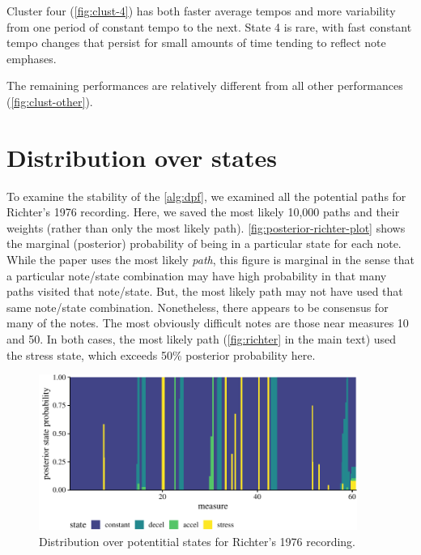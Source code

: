 \documentclass[aoas]{imsart}
\begin{document}
Cluster four (\autoref{fig:clust-4}) has both faster average tempos and
more variability from one period of constant tempo to the next. State 4
is rare, with fast constant tempo changes that persist for small amounts
of time tending to reflect note emphases.

The remaining performances are relatively different from all other
performances (\autoref{fig:clust-other}).

\hypertarget{distribution-over-states}{%
\section{Distribution over states}\label{distribution-over-states}}

To examine the stability of the \autoref{alg:dpf}, we examined all the
potential paths for Richter's 1976 recording. Here, we saved the most
likely 10,000 paths and their weights (rather than only the most likely
path). \autoref{fig:posterior-richter-plot} shows the marginal
(posterior) probability of being in a particular state for each note.
While the paper uses the most likely \emph{path}, this figure is
marginal in the sense that a particular note/state combination may have
high probability in that many paths visited that note/state. But, the
most likely path may not have used that same note/state combination.
Nonetheless, there appears to be consensus for many of the notes. The
most obviously difficult notes are those near measures 10 and 50. In
both cases, the most likely path (\autoref{fig:richter} in the main
text) used the stress state, which exceeds 50\% posterior probability
here.

\begin{figure}

{\centering \includegraphics[height=2in]{gfx/posterior-richter-plot-1} 

}

\caption{Distribution over potentitial states for Richter's 1976 recording.}\label{fig:posterior-richter-plot}
\end{figure}


\clearpage



\end{document}
